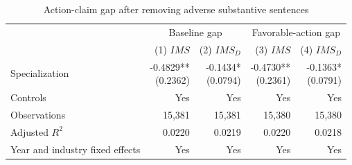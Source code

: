 \begin{table}[H]
    \centering
    \caption{Action-claim gap after removing adverse substantive sentences}
    \label{tab:gi_plus}
    \begin{tabular}{lrrrr}
        \toprule
        & \multicolumn{2}{c}{Baseline gap} & \multicolumn{2}{c}{Favorable-action gap} \\
        \cmidrule(lr){2-3} \cmidrule(lr){4-5}
        & (1) \(IMS\) & (2) \(IMS_D\) & (3) \(IMS\) & (4) \(IMS_D\) \\
        \midrule
        Specialization & \shortstack{-0.4829** \\ (0.2362)} & \shortstack{-0.1434* \\ (0.0794)} & \shortstack{-0.4730** \\ (0.2361)} & \shortstack{-0.1363* \\ (0.0791)} \\
        Controls & Yes & Yes & Yes & Yes \\
        Observations & 15,381 & 15,381 & 15,380 & 15,380 \\
        Adjusted $R^2$ & 0.0220 & 0.0219 & 0.0220 & 0.0218 \\
        Year and industry fixed effects & Yes & Yes & Yes & Yes \\
        \bottomrule
    \end{tabular}
\end{table}
